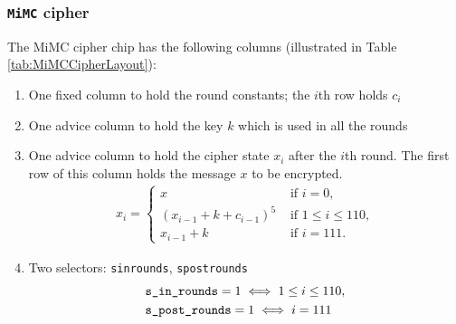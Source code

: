\documentclass[10pt]{article}
\begin{document}
\subsubsection{\texttt{MiMC} cipher}
The MiMC cipher chip has the following columns (illustrated in Table \ref{tab:MiMCCipherLayout}):
\begin{enumerate}
  \item One fixed column to hold the round constants; the $i$th row holds $c_i$
  \item One advice column to hold the key $k$ which is used in all the rounds
  \item One advice column to hold the cipher state $x_i$ after the $i$th round. The first row of this column holds the message $x$ to be encrypted.
    \begin{align*}
      x_i = 
      \begin{cases}
        x & \text{ if } i = 0,\\
        (x_{i-1} + k + c_{i-1})^5 & \text{ if } 1 \le i \le  110,\\
        x_{i-1} + k & \text{ if } i=111.
      \end{cases}
    \end{align*}
  \item Two selectors: \texttt{s\textunderscore in\textunderscore rounds}, \texttt{s\textunderscore post\textunderscore rounds}
    \begin{align*}
      & \texttt{s\textunderscore in\textunderscore rounds} = 1  \iff 1 \le i\le 110,\\
      & \texttt{s\textunderscore post\textunderscore rounds} = 1  \iff i=111
    \end{align*}
\end{enumerate}

\begin{table}[t]
  \centering
  \caption{\texttt{MiMC} cipher layout}
  \label{tab:MiMCCipherLayout}
\end{table}
\end{document}
